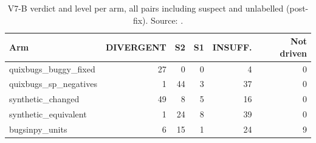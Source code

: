 \begin{table}[t]
\centering\scriptsize
\caption{V7-B verdict and level per arm, all pairs including suspect and unlabelled (post-fix). Source: .}
\label{tab:byarm}
\begin{tabular}{lrrrrr}
\hline
Arm & DIVERGENT & S2 & S1 & INSUFF. & Not driven \\
\hline
quixbugs\_buggy\_fixed & 27 & 0 & 0 & 4 & 0 \\
quixbugs\_sp\_negatives & 1 & 44 & 3 & 37 & 0 \\
synthetic\_changed & 49 & 8 & 5 & 16 & 0 \\
synthetic\_equivalent & 1 & 24 & 8 & 39 & 0 \\
bugsinpy\_units & 6 & 15 & 1 & 24 & 9 \\
\hline
\end{tabular}
\end{table}
